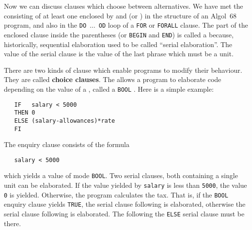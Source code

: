 Now we can discuss clauses which choose between alternatives. We have
met the  consisting of at least
one  enclosed by  and  (or
) in the structure of an Algol~68 program, and also
in the \verb|DO|~$\ldots$~\verb|OD| loop of a \verb|FOR| or
\verb|FORALL| clause.  The part of the enclosed clause inside the
parentheses (or \verb|BEGIN| and \verb|END|) is called a
 because,
historically, sequential elaboration used to be called ``serial
elaboration''.  The value of the serial clause is the value of the
last phrase which must be a unit.

There are two kinds of clause which enable programs to modify their
behaviour. They are called \textbf{choice clauses}.  The
 allows a program
to elaborate code depending on the value of a
, called a \verb|BOOL|
. Here is a simple
example:
\begin{verbatim}
   IF   salary < 5000
   THEN 0
   ELSE (salary-allowances)*rate
   FI
\end{verbatim}
\noindent
The enquiry clause consists of the formula
\begin{verbatim}
   salary < 5000
\end{verbatim}
\noindent
which yields a value of mode \verb|BOOL|. Two serial clauses, both
containing a single unit can be elaborated. If the value yielded by
\verb|salary| is less than \verb|5000|, the value \verb|0| is
yielded.  Otherwise, the program calculates the tax. That is, if the
\verb|BOOL| enquiry clause yields \verb|TRUE|, the serial clause
following  is elaborated, otherwise the serial clause
following  is elaborated. The  following the
\verb|ELSE| serial clause must be there.

